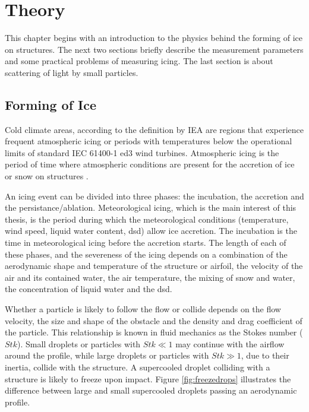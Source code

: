 
\chapter{Theory}
\label{chap:theory}

This chapter begins with an introduction to the physics behind the forming of ice on structures. The next two sections briefly describe the measurement parameters and some practical problems of measuring icing. The last section is about scattering of light by small particles.

\section{Forming of Ice}

Cold climate areas, according to the definition by IEA \cite{iea2017} are regions that experience frequent atmospheric icing or periods with temperatures below the operational limits of standard IEC 61400-1 ed3
wind turbines. Atmospheric icing is the period of time where atmospheric conditions are present for the accretion of ice or snow on structures \cite{iea2017}.

An icing event can be divided into three phases: the incubation, the accretion and the persistance/ablation. Meteorological icing, which is the main interest of this thesis, is the period during which the meteorological conditions (temperature, wind speed, liquid water content, \gls{dsd}) allow ice accretion. The incubation is the time in meteorological icing before the accretion starts. The length of each of these phases, and the severeness of the icing depends on a combination of the aerodynamic shape and temperature of the structure or airfoil, the velocity of the air and its contained water, the air temperature, the mixing of snow and water, the concentration of liquid water and the \gls{dsd}.

Whether a particle is likely to follow the flow or collide depends on the flow velocity, the size and shape of the obstacle and the density and drag coefficient of the particle. This relationship is known in fluid mechanics as the Stokes number ($Stk$). Small droplets or particles with $Stk \ll1$ may continue with the airflow around the profile, while large droplets or particles with $Stk \gg 1$, due to their inertia, collide with the structure. A supercooled droplet colliding with a structure is likely to freeze upon impact. Figure \ref{fig:freezedrops} illustrates the difference between large and small supercooled droplets passing an aerodynamic profile.


